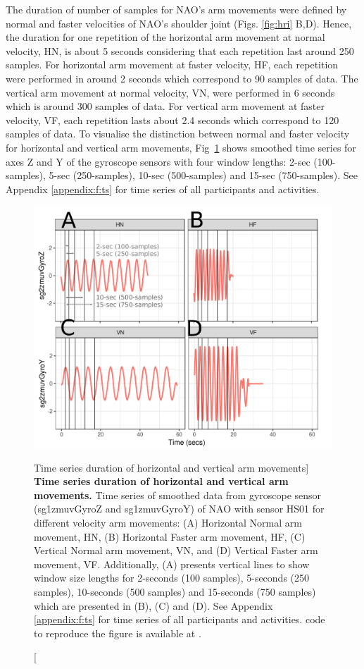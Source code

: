 The duration of number of samples for NAO's arm movements were defined by 
normal and faster velocities of NAO's shoulder joint (Figs. \ref{fig:hri} B,D). 
Hence, the duration for one repetition of the horizontal 
arm movement at normal velocity, HN, is about 5 seconds considering that 
each repetition last around 250 samples. For horizontal arm movement at 
faster velocity, HF, each repetition were performed in around 2 seconds 
which correspond to 90 samples of data. 
The vertical arm movement at normal velocity, VN, were performed  in 6 seconds 
which is around 300 samples of data.
For vertical arm movement at faster velocity, VF, each repetition lasts 
about 2.4 seconds which correspond to 120 samples of data.
To visualise the distinction between normal and faster velocity for horizontal 
and vertical arm movements, Fig~\ref{fig:sts} shows smoothed time series 
for axes Z and Y of the gyroscope sensors with four window lengths: 
2-sec (100-samples), 5-sec (250-samples), 10-sec (500-samples) 
and 15-sec (750-samples).
See Appendix \ref{appendix:f:ts} for 
time series of all participants and activities. 
\begin{figure}
  \centering
  \includegraphics[width=1.0\textwidth]{fig_4_04}
    \caption
	[Time series duration of horizontal and vertical arm movements]{
	{\bf Time series duration of horizontal and vertical arm movements.} 
		Time series of smoothed data from gyroscope sensor 
		(sg1zmuvGyroZ and sg1zmuvGyroY) of NAO 
		with sensor HS01 for different velocity arm movements: 
		(A) Horizontal Normal arm movement, HN, 
		(B) Horizontal Faster arm movement, HF,
		(C) Vertical Normal arm movement, VN, and 
		(D) Vertical Faster arm movement, VF.
		Additionally, (A) presents vertical lines 
		to show window size lengths for 2-seconds 
		(100 samples), 5-seconds (250 samples), 
		10-seconds (500 samples) and 15-seconds (750 samples)
		which are presented in (B), (C) and (D).
		See Appendix \ref{appendix:f:ts} for 
		time series of all participants and activities. 
	\R code to reproduce the figure is available at 
	.
        }
	\label{fig:sts}
\end{figure}
